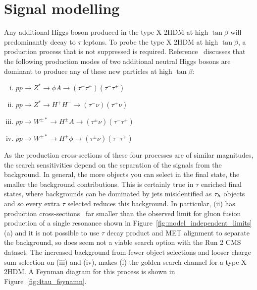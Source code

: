 \section{Signal modelling}
\label{sec:4tau_signal_modelling}

Any additional Higgs boson produced in the type X \ac{2HDM} at high $\tan\beta$ will predominantly decay to $\tau$ leptons.
To probe the type X \ac{2HDM} at high $\tan\beta$, a production process that is not suppressed is required.
Reference~\cite{Jueid:2021avn} discusses that the following production modes of two additional neutral Higgs bosons are dominant to produce any of these new particles at high $\tan\beta$:
\begin{enumerate}[i)]
  \item $pp \rightarrow Z^{*} \rightarrow \phi A \rightarrow (\tau^{-}\tau^{+})(\tau^{-}\tau^{+})$
  \item $pp \rightarrow Z^{*} \rightarrow H^{+}H^{-} \rightarrow (\tau^{-}\nu)(\tau^{+}\nu)$
  \item $pp \rightarrow W^{\pm *} \rightarrow H^{\pm}A \rightarrow (\tau^{\pm}\nu)(\tau^{-}\tau^{+})$
  \item $pp \rightarrow W^{\pm *} \rightarrow H^{\pm}\phi \rightarrow (\tau^{\pm}\nu)(\tau^{-}\tau^{+})$
\end{enumerate}
As the production cross-sections of these four processes are of similar magnitudes, the search sensitivities depend on the separation of the signals from the background.
In general, the more objects you can select in the final state, the smaller the background contributions.
This is certainly true in $\tau$ enriched final states, where backgrounds can be dominated by jets misidentified as $\tau_{h}$ objects and so every extra $\tau$ selected reduces this background.
In particular, (ii) has production cross-sections~\cite{Jueid:2021avn} far smaller than the observed limit for gluon fusion production of a single resonance shown in Figure~\ref{fig:model_independent_limits}(a) and it is not possible to use $\tau$ decay product and \ac{MET} alignment to separate the background, so does seem not a viable search option with the Run 2 \ac{CMS} dataset.
The increased background from fewer object selections and looser charge sum selection on (iii) and (iv), makes (i) the golden search channel for a type X \ac{2HDM}. 
A Feynman diagram for this process is shown in Figure~\ref{fig:4tau_feynamn}. \\

